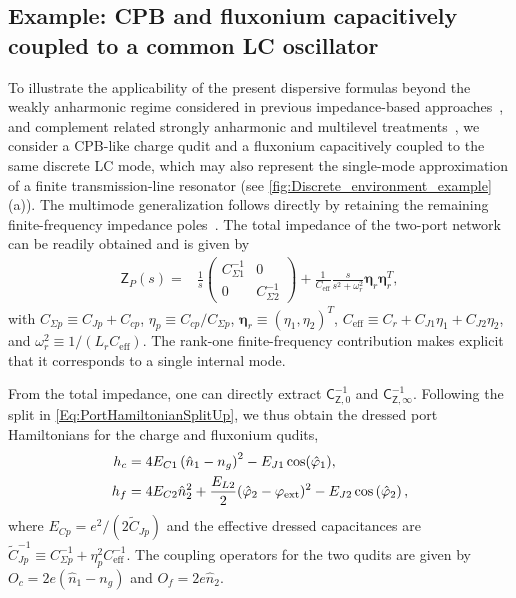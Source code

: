 \documentclass[prx,aps,twocolumn,article]{revtex4-2}
\newcommand{\msf}[1]{\mathsf{#1}}
\newcommand{\bsb}[1]{\boldsymbol{#1}}
\newcommand{\msZ}{\msf{Z}}
\newcommand{\msC}{\msf{C}}
\begin{document}
\subsection*{Example: CPB and fluxonium capacitively coupled to a common LC oscillator}
\label{Sec:DiscreteMixedQuditExample}
To illustrate the applicability of the present dispersive formulas beyond the weakly anharmonic regime considered in previous impedance-based
approaches~\cite{Solgun:2019,Labarca:2024}, and complement related strongly anharmonic and multilevel treatments~\cite{Roth:2019,Khan:2024}, we consider
a CPB-like charge qudit and a fluxonium capacitively coupled to the same discrete LC mode, which may also represent the single-mode approximation of a finite transmission-line resonator
(see \cref{fig:Discrete_environment_example}(a)).
The multimode generalization follows directly by retaining the remaining finite-frequency impedance poles~\cite{ParraRodriguez:2018,Borrell:2026}. The total impedance of the two-port network can be readily obtained and is given by
\begin{align}
\msZ_P(s)
={}&
\frac{1}{s}
\begin{pmatrix}
C_{\Sigma1}^{-1} & 0 \\
0 & C_{\Sigma2}^{-1}
\end{pmatrix}
+
\frac{1}{C_{\mathrm{eff}}}
\frac{s}{s^2+\omega_r^2}
\bsb{\eta}_r\bsb{\eta}_r^{T},
\label{Eq:DiscreteExampleImpedance}
\end{align}
with $C_{\Sigma p}\equiv C_{Jp}+C_{cp}$, $\eta_p\equiv C_{cp}/C_{\Sigma p}$,
$\bsb{\eta}_r\equiv(\eta_1,\eta_2)^T$, $C_{\mathrm{eff}}\equiv C_r+C_{J1}\eta_1+C_{J2}\eta_2$, and $\omega_r^2\equiv1/(L_rC_{\mathrm{eff}})$.
The rank-one finite-frequency contribution makes explicit that it
corresponds to a single internal mode.

From the total impedance, one can directly extract
$\msC_{\msZ,0}^{-1}$ and $\msC_{\msZ,\infty}^{-1}$. Following the split in \cref{Eq:PortHamiltonianSplitUp}, we thus obtain the dressed port Hamiltonians for the charge and fluxonium
qudits,
\begin{align}
\begin{aligned}
    h_c
    &=
    4E_{C1}
    \left(
        \hat n_1-n_g
    \right)^2
    -
    E_{J1}\cos(\hat\varphi_1),
    \\
    h_f
    &=
    4E_{C2}\hat n_2^2
    +
    \frac{E_{L2}}{2}(\hat{\varphi}_2-\varphi_{\rm ext})^2
    -
    E_{J2}
    \cos
    \left(
        \hat\varphi_2
    \right),
    \end{aligned}
    \label{Eq:DispersiveExampleLocalHamiltonian}
\end{align}
where $E_{Cp}=e^2/(2\tilde{C}_{Jp})$ and the effective dressed
capacitances are
$\tilde{C}_{Jp}^{-1}\equiv
C_{\Sigma p}^{-1}+\eta_p^2 C_{\mathrm{eff}}^{-1}$.
The coupling operators for the two qudits are given by
$O_c=2e(\hat n_1-n_g)$ and $O_f=2e\hat n_2$.
\end{document}
